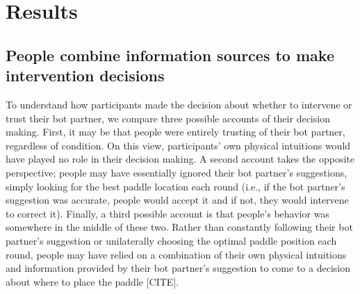 \documentclass[10pt,letterpaper]{article}
\begin{document}
\section{Results}

\subsection{People combine information sources to make intervention decisions}

To understand how participants made the decision about whether to intervene or trust their bot partner, we compare three possible accounts of their decision making. First, it may be that people were entirely trusting of their bot partner, regardless of condition. On this view, participants' own physical intuitions would have played no role in their decision making. A second account takes the opposite perspective; people may have essentially ignored their bot partner's suggestions, simply looking for the best paddle location each round (i.e., if the bot partner's suggestion was accurate, people would accept it and if not, they would intervene to correct it). Finally, a third possible account is that people's behavior was somewhere in the middle of these two. Rather than constantly following their bot partner's suggestion or unilaterally choosing the optimal paddle position each round, people may have relied on a combination of their own physical intuitions and information provided by their bot partner's suggestion to come to a decision about where to place the paddle [CITE]. 
\end{document}

